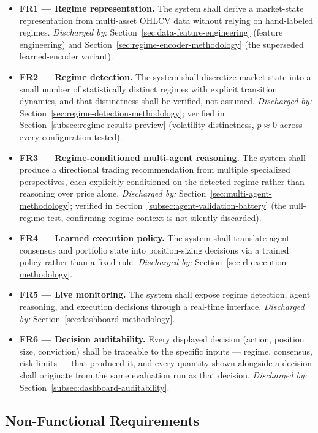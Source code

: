 \begin{itemize}
    \item \textbf{FR1 --- Regime representation.} The system shall derive a market-state representation from multi-asset OHLCV data without relying on hand-labeled regimes. \emph{Discharged by:} Section~\ref{sec:data-feature-engineering} (feature engineering) and Section~\ref{sec:regime-encoder-methodology} (the superseded learned-encoder variant).
    \item \textbf{FR2 --- Regime detection.} The system shall discretize market state into a small number of statistically distinct regimes with explicit transition dynamics, and that distinctness shall be verified, not assumed. \emph{Discharged by:} Section~\ref{sec:regime-detection-methodology}; verified in Section~\ref{subsec:regime-results-preview} (volatility distinctness, $p\approx0$ across every configuration tested).
    \item \textbf{FR3 --- Regime-conditioned multi-agent reasoning.} The system shall produce a directional trading recommendation from multiple specialized perspectives, each explicitly conditioned on the detected regime rather than reasoning over price alone. \emph{Discharged by:} Section~\ref{sec:multi-agent-methodology}; verified in Section~\ref{subsec:agent-validation-battery} (the null-regime test, confirming regime context is not silently discarded).
    \item \textbf{FR4 --- Learned execution policy.} The system shall translate agent consensus and portfolio state into position-sizing decisions via a trained policy rather than a fixed rule. \emph{Discharged by:} Section~\ref{sec:rl-execution-methodology}.
    \item \textbf{FR5 --- Live monitoring.} The system shall expose regime detection, agent reasoning, and execution decisions through a real-time interface. \emph{Discharged by:} Section~\ref{sec:dashboard-methodology}.
    \item \textbf{FR6 --- Decision auditability.} Every displayed decision (action, position size, conviction) shall be traceable to the specific inputs --- regime, consensus, risk limits --- that produced it, and every quantity shown alongside a decision shall originate from the same evaluation run as that decision. \emph{Discharged by:} Section~\ref{subsec:dashboard-auditability}.
\end{itemize}

\subsection{Non-Functional Requirements}
\label{subsec:non-functional-requirements}

